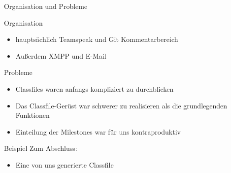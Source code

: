 \begin{frame}[fragile]{Organisation und Probleme}

\pause
Organisation
\pause
  \begin{itemize}
  \item hauptsächlich Teamspeak und Git Kommentarbereich
  \pause
  \item Außerdem XMPP und E-Mail 
  \pause
  \end{itemize}
Probleme
\pause
  \begin{itemize}
  \item Classfiles waren anfangs kompliziert zu durchblicken
  \pause
  \item Das Classfile-Gerüst war schwerer zu realisieren als die grundlegenden Funktionen
  \pause
  \item Einteilung der Milestones war für uns kontraproduktiv
  \end{itemize}
\end{frame}

\begin{frame}[fragile]{Beispiel}
Zum Abschluss:
  \begin{itemize}
  \item Eine von uns generierte Classfile
  \end{itemize}
\end{frame}